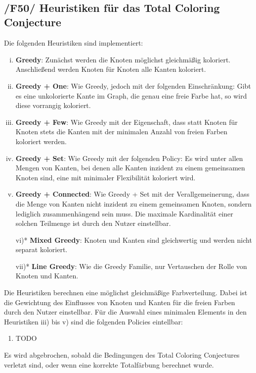 \documentclass{article}
\begin{document}
	
	~\newpage
	\subsection*{/F50/ Heuristiken für das Total Coloring Conjecture} \label{f50} 
	Die folgenden Heuristiken sind implementiert:
	\begin{enumerate}[i)]
		\item{\textbf{Greedy}: Zunächst werden die Knoten möglichst gleichmäßig koloriert. Anschließend werden Knoten für Knoten alle Kanten koloriert.}
		\item{\textbf{Greedy + One}: Wie Greedy, jedoch mit der folgenden Einschränkung: Gibt es eine unkolorierte Kante im Graph, die genau eine freie Farbe hat, so wird diese vorrangig koloriert.}
		\item{\textbf{Greedy + Few}: Wie Greedy mit der Eigenschaft, dass statt Knoten für Knoten stets die Kanten mit der minimalen Anzahl von freien Farben koloriert werden.}
		\item{\textbf{Greedy + Set}: Wie Greedy mit der folgenden Policy: Es wird unter allen Mengen von Kanten, bei denen alle Kanten inzident zu einem gemeinsamen Knoten sind, eine mit minimaler Flexibilität koloriert wird.}
		\item{\textbf{Greedy + Connected}: Wie Greedy + Set mit der Verallgemeinerung, dass die Menge von Kanten nicht inzident zu einem gemeinsamen Knoten, sondern lediglich zusammenhängend sein muss. Die maximale Kardinalität einer solchen Teilmenge ist durch den Nutzer einstellbar.}
		\item[vi)*]{\textbf{Mixed Greedy}: Knoten und Kanten sind gleichwertig und werden nicht separat koloriert.}
		\item[vii)*]{\textbf{Line Greedy}: Wie die Greedy Familie, nur Vertauschen der Rolle von Knoten und Kanten.}
	\end{enumerate}
	Die Heuristiken berechnen eine möglichst gleichmäßige Farbverteilung. Dabei ist die Gewichtung des Einflusses von Knoten und Kanten für die freien Farben durch den Nutzer einstellbar. Für die Auswahl eines minimalen Elements in den Heuristiken iii) bis v) sind die folgenden Policies eintellbar:
	\begin{enumerate}[-]
		\item{TODO}
	\end{enumerate}
	
	Es wird abgebrochen, sobald die Bedingungen des Total Coloring Conjectures verletzt sind, oder wenn eine korrekte Totalfärbung berechnet wurde. 
	
\end{document}
